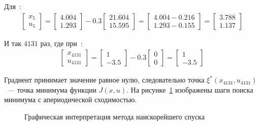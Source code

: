 \begin{enumerate}
	Для \,:
	\begin{align*}
		\begin{bmatrix}
			x_{5} \\ u_{5}
		\end{bmatrix}
		=
		\begin{bmatrix}
			4.004 \\
			1.293
		\end{bmatrix}
		-
		0.3
		\begin{bmatrix}
			21.604 \\
			15.595
		\end{bmatrix}
		=
		\begin{bmatrix}
			4.004 - 0.216 \\
			1.293 - 0.155
		\end{bmatrix}
		= 
		\begin{bmatrix}
			3.788 \\
			1.137
		\end{bmatrix}	
	\end{align*}
	
	И так $4131$ раз, где при \,:
	\begin{align*}
		\begin{bmatrix}
			x_{4131} \\ u_{4131}
		\end{bmatrix}
		=
		\begin{bmatrix}
			   1 \\
			-3.5
		\end{bmatrix}
		-
		0.3
		\begin{bmatrix}
			0 \\ 0
		\end{bmatrix}
		=
		\begin{bmatrix}
			1 \\ -3.5
		\end{bmatrix}	
	\end{align*}

	Градиент принимает значение равное нулю, следовательно точка $\xi^*(x_{4131}, u_{4131})$~--- точка минимума функции $J(x,u)$. На рисунке~\ref{FD_01} изображены шаги поиска минимума с апериодической сходимостью.
	
	\begin{figure}[h!]
	\begin{minipage}[h]{0.5\linewidth}
	\end{minipage}
	\hfill
	\begin{minipage}[h]{0.5\linewidth}
	\end{minipage}
	\caption{Графическая интерпретация метода наискорейшего спуска}
	\label{FD_01}
	\end{figure}		
\end{enumerate}


